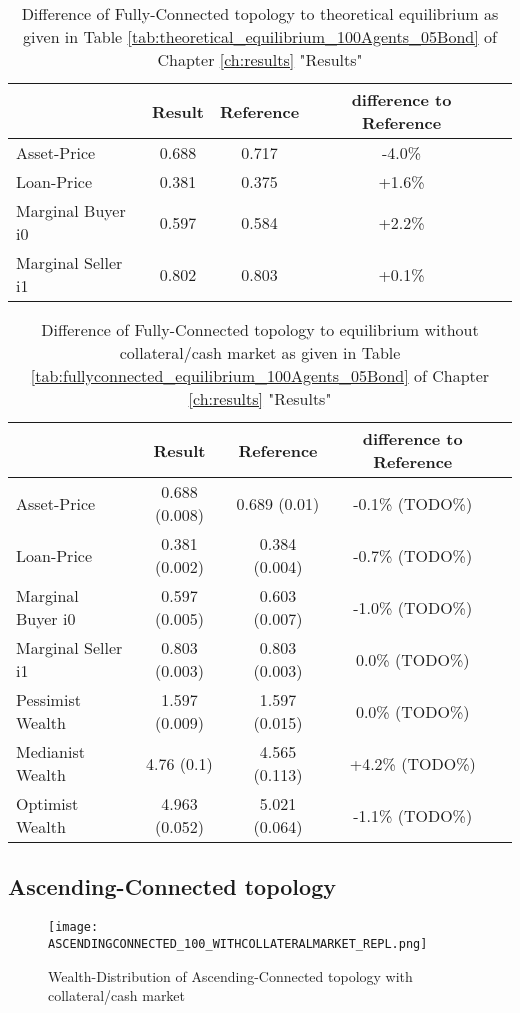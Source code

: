 \documentclass[Bachelorarbeit.tex]{subfiles}
\begin{document}
\begin{table}[H]
	\caption{Difference of Fully-Connected topology to theoretical equilibrium as given in Table \ref{tab:theoretical_equilibrium_100Agents_05Bond} of Chapter \ref{ch:results} "Results"}
	\centering
	\begin{tabular} { l c c c r }
		& Result & Reference & difference to Reference \\
		\hline
		Asset-Price & 0.688 & 0.717 & -4.0\% \\
		Loan-Price & 0.381 & 0.375 & +1.6\% \\
		Marginal Buyer i0 & 0.597 & 0.584 & +2.2\% \\
		Marginal Seller i1 & 0.802 & 0.803 & +0.1\% \\
		\hline
	\end{tabular}
\end{table} 

\begin{table}[H]
	\caption{Difference of Fully-Connected topology to equilibrium without collateral/cash market as given in Table \ref{tab:fullyconnected_equilibrium_100Agents_05Bond} of Chapter \ref{ch:results} "Results"}
	\centering
	\begin{tabular} { l c c c r }
		& Result & Reference & difference to Reference \\
		\hline
		Asset-Price & 0.688 (0.008) & 0.689 (0.01) & -0.1\% (TODO\%) \\
		Loan-Price & 0.381 (0.002) & 0.384 (0.004) & -0.7\% (TODO\%) \\
		Marginal Buyer i0 & 0.597 (0.005) & 0.603 (0.007) & -1.0\% (TODO\%) \\
		Marginal Seller i1 & 0.803 (0.003) & 0.803 (0.003) & 0.0\% (TODO\%) \\
		\hline
		Pessimist Wealth & 1.597 (0.009) & 1.597 (0.015) & 0.0\% (TODO\%) \\
		Medianist Wealth & 4.76 (0.1) & 4.565 (0.113) & +4.2\% (TODO\%) \\
		Optimist Wealth & 4.963 (0.052) & 5.021 (0.064) & -1.1\% (TODO\%) \\
		\hline
	\end{tabular}
\end{table} 

\subsection{Ascending-Connected topology}
\begin{figure}[H]
	\centering
  \texttt{[image: ASCENDINGCONNECTED\_100\_WITHCOLLATERALMARKET\_REPL.png]}
	\caption{Wealth-Distribution of Ascending-Connected topology with collateral/cash market}
	\label{fig:wealth_ASCENDINGCONNECTED_100_WITHCOLLATERALMARKET_REPL}
\end{figure}
\end{document}
